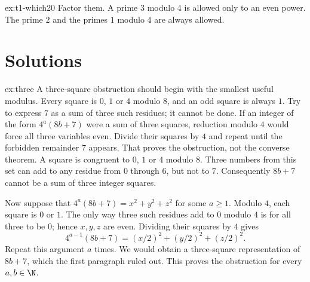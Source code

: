 \begin{hint}{ex:t1-which20}
Factor them. A prime $3$ modulo $4$ is allowed only to an even power. The prime $2$ and the primes $1$ modulo $4$ are always allowed.
\end{hint}

\section{Solutions}

\begin{solution}{ex:three}
\idea A three-square obstruction should begin with the smallest useful modulus. Every square is $0$, $1$ or $4$ modulo $8$, and an odd square is always $1$. Try to express $7$ as a sum of three such residues; it cannot be done. If an integer of the form $4^a(8b+7)$ were a sum of three squares, reduction modulo $4$ would force all three variables even. Divide their squares by $4$ and repeat until the forbidden remainder $7$ appears. That proves the obstruction, not the converse theorem.
\writeup A square is congruent to $0$, $1$ or $4$ modulo $8$. Three numbers from this set can add to any residue from $0$ through $6$, but not to $7$. Consequently $8b+7$ cannot be a sum of three integer squares.

Now suppose that $4^a(8b+7)=x^2+y^2+z^2$ for some $a\ge1$. Modulo $4$, each square is $0$ or $1$. The only way three such residues add to $0$ modulo $4$ is for all three to be $0$; hence $x,y,z$ are even. Dividing their squares by $4$ gives
\[
4^{a-1}(8b+7)=(x/2)^2+(y/2)^2+(z/2)^2.
\]
Repeat this argument $a$ times. We would obtain a three-square representation of $8b+7$, which the first paragraph ruled out. This proves the obstruction for every $a,b\in\N$.
\end{solution}

